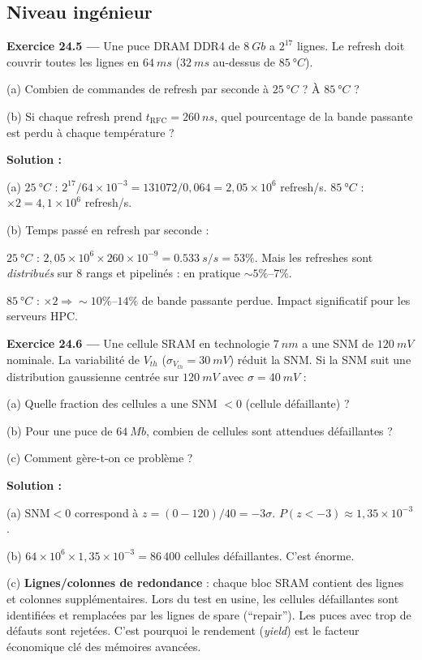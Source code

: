 \documentclass[12pt,a4paper,twoside]{book}
\begin{document}
\subsection*{Niveau ingénieur}

\textbf{Exercice 24.5 ---} Une puce DRAM DDR4 de $\SI{8}{Gb}$ a $2^{17}$ lignes. Le refresh doit couvrir toutes les lignes en $\SI{64}{ms}$ ($\SI{32}{ms}$ au-dessus de $\SI{85}{°C}$).

(a) Combien de commandes de refresh par seconde à $\SI{25}{°C}$ ? À $\SI{85}{°C}$ ?

(b) Si chaque refresh prend $t_{\text{RFC}} = \SI{260}{ns}$, quel pourcentage de la bande passante est perdu à chaque température ?

\begin{pratique}
\textbf{Solution :}

(a) $\SI{25}{°C}$ : $2^{17}/64\times10^{-3} = 131072/0{,}064 = 2{,}05\times10^6$ refresh/s. $\SI{85}{°C}$ : $\times 2 = 4{,}1\times10^6$ refresh/s.

(b) Temps passé en refresh par seconde :

$\SI{25}{°C}$ : $2{,}05\times10^6 \times 260\times10^{-9} = \SI{0.533}{s/s} = 53\%$. Mais les refreshes sont \textit{distribués} sur 8 rangs et pipelinés : en pratique $\sim 5\%$--$7\%$.

$\SI{85}{°C}$ : $\times 2 \Rightarrow \sim 10\%$--$14\%$ de bande passante perdue. Impact significatif pour les serveurs HPC.
\end{pratique}

\textbf{Exercice 24.6 ---} Une cellule SRAM en technologie $\SI{7}{nm}$ a une SNM de $\SI{120}{mV}$ nominale. La variabilité de $V_{th}$ ($\sigma_{V_{th}} = \SI{30}{mV}$) réduit la SNM. Si la SNM suit une distribution gaussienne centrée sur $\SI{120}{mV}$ avec $\sigma = \SI{40}{mV}$ :

(a) Quelle fraction des cellules a une SNM $< 0$ (cellule défaillante) ?

(b) Pour une puce de $\SI{64}{Mb}$, combien de cellules sont attendues défaillantes ?

(c) Comment gère-t-on ce problème ?

\begin{pratique}
\textbf{Solution :}

(a) $\text{SNM} < 0$ correspond à $z = (0-120)/40 = -3\sigma$. $P(z < -3) \approx 1{,}35\times10^{-3}$.

(b) $64\times10^6 \times 1{,}35\times10^{-3} = 86\,400$ cellules défaillantes. C'est énorme.

(c) \textbf{Lignes/colonnes de redondance} : chaque bloc SRAM contient des lignes et colonnes supplémentaires. Lors du test en usine, les cellules défaillantes sont identifiées et remplacées par les lignes de spare (``repair''). Les puces avec trop de défauts sont rejetées. C'est pourquoi le rendement (\textit{yield}) est le facteur économique clé des mémoires avancées.
\end{pratique}
\end{document}
